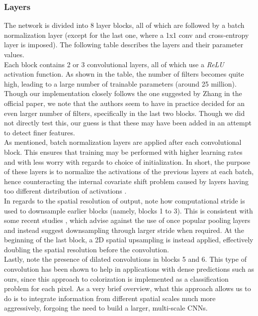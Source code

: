 \documentclass[twoside,twocolumn]{article}
\begin{document}
\subsubsection{Layers}
The network is divided into 8 layer blocks, all of which are followed by a batch normalization layer (except for the last one, where a 1x1 conv and cross-entropy layer is imposed). The following table describes the layers and their parameter values.\\
Each block contains 2 or 3 convolutional layers, all of which use a \textit{ReLU} activation function. As shown in the table, the number of filters becomes quite high, leading to a large number of trainable parameters (around 25 million). Though our implementation closely follows the one suggested by Zhang \cite{Zhang:2016} in the official paper, we note that the authors seem to have in practice decided for an even larger number of filters, specifically in the last two blocks. Though we did not directly test this, our guess is that these may have been added in an attempt to detect finer features.\\
As mentioned, batch normalization layers are applied after each convolutional block. This ensures that training may be performed with higher learning rates and with less worry with regards to choice of initialization. In short, the purpose of these layers is to normalize the activations of the previous layers at each batch, hence counteracting the internal covariate shift problem caused by layers having too different distribution of activations \cite{Sergey:2015}.\\
In regards to the spatial resolution of output, note how computational stride is used to downsample earlier blocks (namely, blocks 1 to 3). This is consistent with some recent studies \cite{Jost:2015}, which advise against the use of once popular pooling layers and instead suggest downsampling through larger stride when required. At the beginning of the last block, a 2D spatial upsampling is instead applied, effectively doubling the spatial resolution before the convolution. \\
Lastly, note the presence of dilated convolutions \cite{Fisher:2016} in blocks 5 and 6. This type of convolution has been shown to help in applications with dense predictions such as ours, since this approach to colorization is implemented as a classification problem for each pixel. As a very brief overview, what this approach allows us to do is to integrate information from different spatial scales much more aggressively,  forgoing the need to build a larger, multi-scale CNNs.
\end{document}
